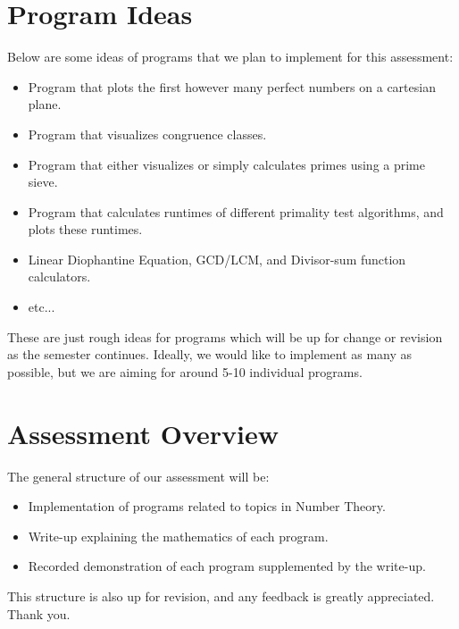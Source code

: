\documentclass[11pt]{article}
\begin{document}
\section*{Program Ideas}
Below are some ideas of programs that we plan to implement for this assessment:
\begin{itemize}
\item Program that plots the first however many perfect numbers on a cartesian plane.
\item Program that visualizes congruence classes.
\item Program that either visualizes or simply calculates primes using a prime sieve.
\item Program that calculates runtimes of different primality test algorithms, and plots these runtimes.
\item Linear Diophantine Equation, GCD/LCM, and Divisor-sum function calculators.
\item etc...
\end{itemize}
These are just rough ideas for programs which will be up for change or revision as the semester continues.
Ideally, we would like to implement as many as possible, but we are aiming for around 5-10 individual programs.
\section*{Assessment Overview}
The general structure of our assessment will be:
\begin{itemize}
\item Implementation of programs related to topics in Number Theory.
\item Write-up explaining the mathematics of each program.
\item Recorded demonstration of each program supplemented by the write-up.
\end{itemize}
This structure is also up for revision, and any feedback is greatly appreciated. Thank you.
\end{document}
